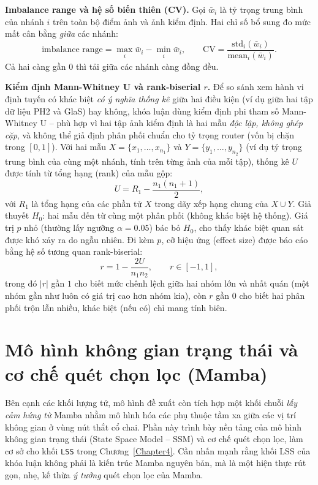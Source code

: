 \noindent\textbf{Imbalance range và hệ số biến thiên (CV).} Gọi $\bar{w}_i$ là tỷ trọng trung bình của nhánh $i$ trên toàn bộ điểm ảnh và ảnh kiểm định. Hai chỉ số bổ sung đo mức mất cân bằng \emph{giữa} các nhánh:
\begin{equation}
    \text{imbalance range} = \max_i \bar{w}_i - \min_i \bar{w}_i,
    \qquad
    \text{CV} = \frac{\mathrm{std}_i(\bar{w}_i)}{\mathrm{mean}_i(\bar{w}_i)}.
\end{equation}
Cả hai càng gần $0$ thì tải giữa các nhánh càng đồng đều.

\noindent\textbf{Kiểm định Mann-Whitney U và rank-biserial $r$.} Để so sánh xem hành vi định tuyến có khác biệt \emph{có ý nghĩa thống kê} giữa hai điều kiện (ví dụ giữa hai tập dữ liệu PH2 và GlaS) hay không, khóa luận dùng kiểm định phi tham số Mann-Whitney U -- phù hợp vì hai tập ảnh kiểm định là hai mẫu \emph{độc lập, không ghép cặp}, và không thể giả định phân phối chuẩn cho tỷ trọng router (vốn bị chặn trong $[0,1]$). Với hai mẫu $X=\{x_1,\dots,x_{n_1}\}$ và $Y=\{y_1,\dots,y_{n_2}\}$ (ví dụ tỷ trọng trung bình của cùng một nhánh, tính trên từng ảnh của mỗi tập), thống kê $U$ được tính từ tổng hạng (rank) của mẫu gộp:
\begin{equation}
    U = R_1 - \frac{n_1(n_1+1)}{2},
\end{equation}
với $R_1$ là tổng hạng của các phần tử $X$ trong dãy xếp hạng chung của $X\cup Y$. Giả thuyết $H_0$: hai mẫu đến từ cùng một phân phối (không khác biệt hệ thống). Giá trị $p$ nhỏ (thường lấy ngưỡng $\alpha=0.05$) bác bỏ $H_0$, cho thấy khác biệt quan sát được khó xảy ra do ngẫu nhiên. Đi kèm $p$, cỡ hiệu ứng (effect size) được báo cáo bằng hệ số tương quan rank-biserial:
\begin{equation}
    r = 1 - \frac{2U}{n_1 n_2}, \qquad r \in [-1, 1],
\end{equation}
trong đó $|r|$ gần $1$ cho biết mức chênh lệch giữa hai nhóm lớn và nhất quán (một nhóm gần như luôn có giá trị cao hơn nhóm kia), còn $r$ gần $0$ cho biết hai phân phối trộn lẫn nhiều, khác biệt (nếu có) chỉ mang tính biên.

\FloatBarrier

\section{Mô hình không gian trạng thái và cơ chế quét chọn lọc (Mamba)}
\label{sec:ssm}
Bên cạnh các khối lượng tử, mô hình đề xuất còn tích hợp một khối chuỗi \emph{lấy cảm hứng từ} Mamba nhằm mô hình hóa các phụ thuộc tầm xa giữa các vị trí không gian ở vùng nút thắt cổ chai. Phần này trình bày nền tảng của mô hình không gian trạng thái (State Space Model -- SSM) và cơ chế quét chọn lọc, làm cơ sở cho khối \texttt{LSS} trong Chương~\ref{Chapter4}. Cần nhấn mạnh rằng khối LSS của khóa luận không phải là kiến trúc Mamba nguyên bản, mà là một hiện thực rút gọn, nhẹ, kế thừa \emph{ý tưởng} quét chọn lọc của Mamba.

